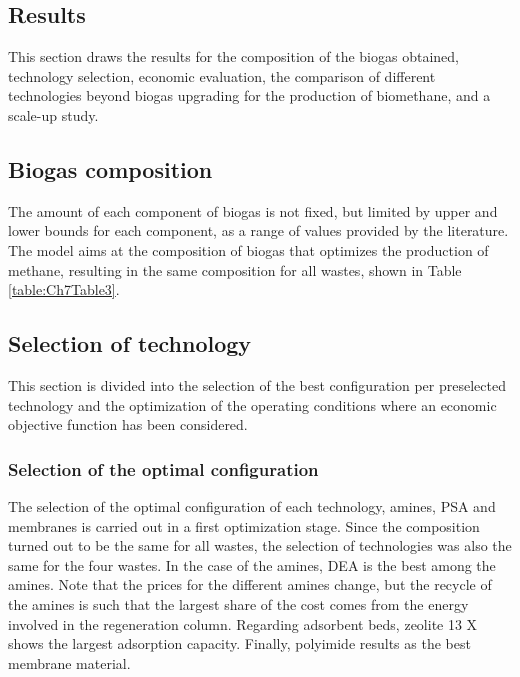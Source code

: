 \begin{refsection}[referencesCh7]
\section{Results}\label{section:Sec4}
This section draws the results for the composition of the biogas obtained, technology selection, economic evaluation, the comparison of different technologies beyond biogas upgrading for the production of biomethane, and a scale-up study.

\subsection{Biogas composition}
The amount of each component of biogas is not fixed, but limited by upper and lower bounds for each component, as a range of values provided by the literature. The model aims at the composition of biogas that optimizes the production of methane, resulting in the same composition for all wastes, shown in Table \ref{table:Ch7Table3}.

\begin{table}[h]
	\centering
	\caption{Raw biogas composition.}
	\label{table:Ch7Table3}
\end{table}

\subsection{Selection of technology}
This section is divided into the selection of the best configuration per preselected technology and the optimization of the operating conditions where an economic objective function has been considered.

\subsubsection{Selection of the optimal configuration}
The selection of the optimal configuration of each technology, amines, PSA and membranes is carried out in a first optimization stage. Since the composition turned out to be the same for all wastes, the selection of technologies was also the same for the four wastes. In the case of the amines, DEA is the best among the amines. Note that the prices for the different amines change, but the recycle of the amines is such that the largest share of the cost comes from the energy involved in the regeneration column. Regarding adsorbent beds, zeolite 13 X shows the largest adsorption capacity. Finally, polyimide results as the best membrane material.


\end{refsection}
